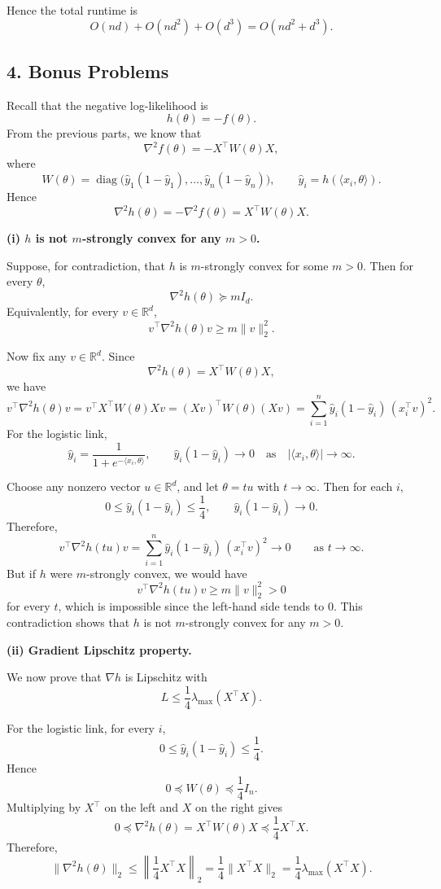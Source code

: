 \documentclass{article}
\begin{document}
Hence the total runtime is
\[
O(nd)+O(nd^2)+O(d^3)=O(nd^2+d^3).
\]
\subsection*{4. Bonus Problems}

Recall that the negative log-likelihood is
\[
h(\theta)=-f(\theta).
\]
From the previous parts, we know that
\[
\nabla^2 f(\theta)=-X^\top W(\theta)X,
\]
where
\[
W(\theta)=\operatorname{diag}\bigl(\hat y_1(1-\hat y_1),\dots,\hat y_n(1-\hat y_n)\bigr),
\qquad
\hat y_i=h(\langle x_i,\theta\rangle).
\]
Hence
\[
\nabla^2 h(\theta)=-\nabla^2 f(\theta)=X^\top W(\theta)X.
\]

\textbf{(i) \(h\) is not \(m\)-strongly convex for any \(m>0\).}

Suppose, for contradiction, that \(h\) is \(m\)-strongly convex for some \(m>0\). Then for every \(\theta\),
\[
\nabla^2 h(\theta)\succeq mI_d.
\]
Equivalently, for every \(v\in\mathbb{R}^d\),
\[
v^\top \nabla^2 h(\theta)v \ge m\|v\|_2^2.
\]

Now fix any \(v\in\mathbb{R}^d\). Since
\[
\nabla^2 h(\theta)=X^\top W(\theta)X,
\]
we have
\[
v^\top \nabla^2 h(\theta)v
=
v^\top X^\top W(\theta)Xv
=
(Xv)^\top W(\theta)(Xv)
=
\sum_{i=1}^n \hat y_i(1-\hat y_i)\,(x_i^\top v)^2.
\]
For the logistic link,
\[
\hat y_i=\frac{1}{1+e^{-\langle x_i,\theta\rangle}},
\qquad
\hat y_i(1-\hat y_i)\to 0
\quad\text{as}\quad
|\langle x_i,\theta\rangle|\to\infty.
\]

Choose any nonzero vector \(u\in\mathbb{R}^d\), and let \(\theta=t u\) with \(t\to\infty\). Then for each \(i\),
\[
0\le \hat y_i(1-\hat y_i)\le \frac14,
\qquad
\hat y_i(1-\hat y_i)\to 0.
\]
Therefore,
\[
v^\top \nabla^2 h(tu)v
=
\sum_{i=1}^n \hat y_i(1-\hat y_i)\,(x_i^\top v)^2
\longrightarrow 0
\qquad\text{as } t\to\infty.
\]
But if \(h\) were \(m\)-strongly convex, we would have
\[
v^\top \nabla^2 h(tu)v \ge m\|v\|_2^2 >0
\]
for every \(t\), which is impossible since the left-hand side tends to \(0\). This contradiction shows that \(h\) is not \(m\)-strongly convex for any \(m>0\).

\bigskip

\textbf{(ii) Gradient Lipschitz property.}

We now prove that \(\nabla h\) is Lipschitz with
\[
L\le \frac14 \lambda_{\max}(X^\top X).
\]

For the logistic link, for every \(i\),
\[
0\le \hat y_i(1-\hat y_i)\le \frac14.
\]
Hence
\[
0\preceq W(\theta)\preceq \frac14 I_n.
\]
Multiplying by \(X^\top\) on the left and \(X\) on the right gives
\[
0\preceq \nabla^2 h(\theta)=X^\top W(\theta)X \preceq \frac14 X^\top X.
\]
Therefore,
\[
\|\nabla^2 h(\theta)\|_2
\le
\left\|\frac14 X^\top X\right\|_2
=
\frac14 \|X^\top X\|_2
=
\frac14 \lambda_{\max}(X^\top X).
\]
\end{document}
